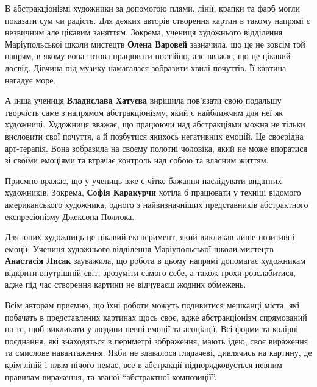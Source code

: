 
В абстракціонізмі художники  за допомогою плями, лінії, крапки та фарб могли
показати сум чи радість. Для деяких авторів  створення картин в такому напрямі
є незвичним але цікавим заняттям. Зокрема, учениця художнього відділення
Маріупольської школи мистецтв \textbf{Олена Варовей} зазначила, що це не зовсім той
напрям, в якому вона готова працювати постійно, але вважає, що це цікавий
досвід. Дівчина під музику намагалася зобразити хвилі почуттів. Її картина
нагадує море.


А інша учениця \textbf{Владислава Хатуєва} вирішила пов'язати свою подальшу творчість
саме з напрямом абстракціонізму, який є найближчим для неї як художниці.
Художниця вважає, що працюючи над абстракціями можна не тільки висловити свої
почуття, а й позбутися якихось негативних емоцій. Це своєрідна арт-терапія.
Вона зобразила на своєму полотні чоловіка, який не може впоратися зі своїми
емоціями та втрачає контроль над собою та власним життям.


Приємно вражає, що у учениць вже є чітке бажання наслідувати видатних
художників. Зокрема, \textbf{Софія Каракурчи} хотіла б працювати у техніці відомого
американського художника, одного з найвизначніших представників абстрактного
експресіонізму Джексона Поллока.

Для юних художниць це цікавий експеримент, який викликав лише позитивні емоції.
Учениця художнього відділення Маріупольської школи мистецтв \textbf{Анастасія Лисак}
зауважила, що робота в цьому напрямі допомагає художникам відкрити внутрішній
світ, зрозуміти самого себе, а також трохи розслабитися, адже під час створення
картини не відчуваєш жодних обмежень.


Всім авторам приємно, що їхні роботи можуть подивитися мешканці міста, які
побачать в представлених картинах щось своє, адже абстракціонізм спрямований на
те, щоб викликати у людини певні емоції та асоціації. Всі форми та колірні
поєднання, які знаходяться в периметрі зображення, мають ідею, своє вираження
та смислове навантаження. Якби не здавалося глядачеві, дивлячись на картину, де
крім ліній і плям нічого немає, все в абстракції підпорядковується певним
правилам вираження, та званої \enquote{абстрактної композиції}.

